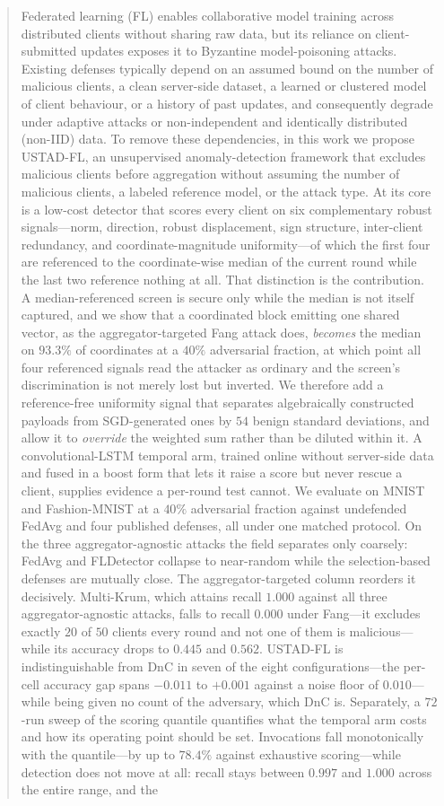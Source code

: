 \documentclass[journal]{IEEEtran}
\begin{document}
\begin{abstract}
Federated learning (FL) enables collaborative model training across distributed clients without sharing raw data, but its reliance on client-submitted updates exposes it to Byzantine model-poisoning attacks. Existing defenses typically depend on an assumed bound on the number of malicious clients, a clean server-side dataset, a learned or clustered model of client behaviour, or a history of past updates, and consequently degrade under adaptive attacks or non-independent and identically distributed (non-IID) data. To remove these dependencies, in this work we propose USTAD-FL, an unsupervised anomaly-detection framework that excludes malicious clients before aggregation without assuming the number of malicious clients, a labeled reference model, or the attack type. At its core is a low-cost detector that scores every client on six complementary robust signals---norm, direction, robust displacement, sign structure, inter-client redundancy, and coordinate-magnitude uniformity---of which the first four are referenced to the coordinate-wise median of the current round while the last two reference nothing at all. That distinction is the contribution. A median-referenced screen is secure only while the median is not itself captured, and we show that a coordinated block emitting one shared vector, as the aggregator-targeted Fang attack does, \emph{becomes} the median on $93.3\%$ of coordinates at a $40\%$ adversarial fraction, at which point all four referenced signals read the attacker as ordinary and the screen's discrimination is not merely lost but inverted. We therefore add a reference-free uniformity signal that separates algebraically constructed payloads from SGD-generated ones by $54$ benign standard deviations, and allow it to \emph{override} the weighted sum rather than be diluted within it. A convolutional-LSTM temporal arm, trained online without server-side data and fused in a boost form that lets it raise a score but never rescue a client, supplies evidence a per-round test cannot. We evaluate on MNIST and Fashion-MNIST at a $40\%$ adversarial fraction against undefended FedAvg and four published defenses, all under one matched protocol. On the three aggregator-agnostic attacks the field separates only coarsely: FedAvg and FLDetector collapse to near-random while the selection-based defenses are mutually close. The aggregator-targeted column reorders it decisively. Multi-Krum, which attains recall $1.000$ against all three aggregator-agnostic attacks, falls to recall $0.000$ under Fang---it excludes exactly $20$ of $50$ clients every round and not one of them is malicious---while its accuracy drops to $0.445$ and $0.562$. USTAD-FL is indistinguishable from DnC in seven of the eight configurations---the per-cell accuracy gap spans $-0.011$ to $+0.001$ against a noise floor of $0.010$---while being given no count of the adversary, which DnC is. Separately, a $72$-run sweep of the scoring quantile quantifies what the temporal arm costs and how its operating point should be set. Invocations fall monotonically with the quantile---by up to $78.4\%$ against exhaustive scoring---while detection does not move at all: recall stays between $0.997$ and $1.000$ across the entire range, and the 
\end{abstract}
\end{document}

